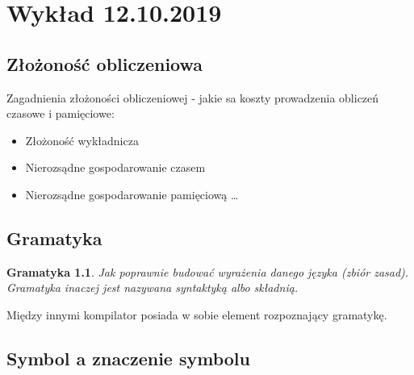 \chapter{Wykład 12.10.2019}
\label{ch:wyklad1}

\section{Złożoność obliczeniowa}

Zagadnienia złożoności obliczeniowej
- jakie sa koszty prowadzenia obliczeń czasowe i pamięciowe:
\begin{itemize}
  \item Złożoność wykładnicza
  \item Nierozsądne gospodarowanie czasem
  \item Nierozsądne gospodarowanie pamięciową \ldots
\end{itemize}


\section{Gramatyka}

\newtheorem*{theorem*}{Gramatyka}
\begin{theorem*} Jak poprawnie budować wyrażenia danego języka (zbiór zasad).
Gramatyka inaczej jest nazywana syntaktyką albo składnią. \end{theorem*}





Między innymi kompilator posiada w sobie element rozpoznający gramatykę. \newline




\section{Symbol a znaczenie symbolu}

